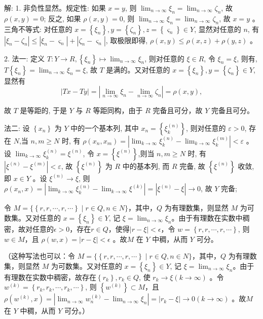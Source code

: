 \documentclass{article}
\begin{document}
\begin{enumerate}
解: 1. 非负性显然。规定性: 如果 $x=y$, 则 $\lim _{n \rightarrow \infty} \xi_n=\lim _{n \rightarrow \infty} \zeta_n$, 故 $\rho(x, y)=0$; 反之, 如果 $\rho(x, y)=0$, 则 $\lim _{n \rightarrow \infty} \xi_n=\lim _{n \rightarrow \infty} \zeta_n$, 故 $x=y$ 。三角不等式: 对任意的 $x=\left\{\xi_n\right\}, y=\left\{\zeta_n\right\}, z=\left\{\varsigma_n\right\} \in Y$, 显然对任意的 $n$, 有 $\left|\xi_n-\zeta_n\right| \leq\left|\xi_n-\varsigma_n\right|+\left|\zeta_n-\varsigma_n\right|$, 取极限即得, $\rho(x, y) \leq \rho(x, z)+\rho(y, z)$ 。

2. 法一: 定义 $T: Y \rightarrow R,\left\{\xi_n\right\} \mapsto \lim _{n \rightarrow \infty} \xi_n$, 则对任意的 $\xi \in R$, 令 $\xi_n=\xi$, 则有, $T\left\{\xi_n\right\}=\lim _{n \rightarrow \infty} \xi_n=\xi$, 故 $T$ 是满的。又对任意的 $x=\left\{\xi_n\right\}, y=\left\{\zeta_n\right\} \in Y$, 显然有
$$
|T x-T y|=\left|\lim _{n \rightarrow \infty} \xi_n-\lim _{n \rightarrow \infty} \zeta_n\right|=\rho(x, y),
$$

故 $T$ 是等距的, 于是 $Y$ 与 $R$ 等距同构，由于 $R$ 完备且可分，故 $Y$ 完备且可分。

法二: 设 $\left\{x_n\right\}$ 为 $Y$ 中的一个基本列, 其中 $x_n=\left\{\xi_k^{(n)}\right\}$, 则对任意的 $\varepsilon>0$, 存在 $N$,当 $n, m \geq N$ 时, 有 $\rho\left(x_n, x_m\right)=\left|\lim _{k \rightarrow \infty} \xi_k^{(n)}-\lim _{k \rightarrow \infty} \xi_k^{(m)}\right|<\varepsilon$ 。设 $\lim _{k \rightarrow \infty} \xi_k^{(n)}=\xi^{(n)}$, 令 $x=\left\{\xi^{(n)}\right\}$,则当 $n, m \geq N$ 时, 有 $\left|\xi^{(n)}-\xi^{(m)}\right|<\varepsilon$, 故 $\left\{\xi^{(n)}\right\}$ 为 $R$ 中的基本列, 而 $R$ 完备, 故 $\left\{\xi^{(n)}\right\}$ 收敛, 即 $x \in Y$ 。设 $\xi^{(n)} \rightarrow \xi$, 则 $\rho\left(x_n, x\right)=\left|\lim _{k \rightarrow \infty} \xi_k^{(n)} - \lim _{k \rightarrow \infty} \xi^{(k)}\right|=\left|\xi^{(n)}-\xi\right| \to 0$, 故 $Y$ 完备;

令 $M=\{\left\{r, r, \cdots, r, \cdots \right\} \mid r \in Q, n \in N\}$，其中，$Q$ 为有理数集，则显然 $M$ 为可数集。又对任意的 $x=\left\{\xi_n\right\} \in Y$, 记 $\xi=\lim _{n \rightarrow \infty}{\xi_n}$。由于有理数在实数中稠密，故对任意的$\epsilon > 0$，存在$r \in Q$，使得$\left|r - \xi \right| < \epsilon$，令 $w=\left\{r, r, \cdots, r, \cdots\right\}$, 则 $w \in M$，且 $\rho\left(w, x\right)=\left|r - \xi\right| < \epsilon$ 。故$M$ 在 $Y$ 中稠，从而 $Y$ 可分。

（这种写法也可以：令 $M=\{\left\{r, r, \cdots, r, \cdots \right\} \mid r \in Q, n \in N\}$，其中，$Q$ 为有理数集，则显然 $M$ 为可数集。又对任意的 $x=\left\{\xi_n\right\} \in Y$, 记 $\xi=\lim _{n \rightarrow \infty}{\xi_n}$。由于有理数在实数中稠密，故存在$\left\{r_k\right\}, r_{k} \in Q$, 使 $r_{k} \rightarrow \xi(k \rightarrow \infty)$ 。令 $w^{(k)}=\left\{r_{k}, r_{k}, \cdots, r_{k}, \cdots\right\}$, 则 $\left\{w^{(k)}\right\} \subset M$，且 $\rho\left(w^{(k)}, x\right)=\left|\lim _{n \rightarrow \infty} w_{n}^{(k)} - \lim _{n \rightarrow \infty} \xi_n\right|=\left|r_{k} - \xi\right| \to 0 \left(k \to \infty \right)$ 。故$M$ 在 $Y$ 中稠，从而 $Y$ 可分。）


\end{enumerate}
\end{document}
